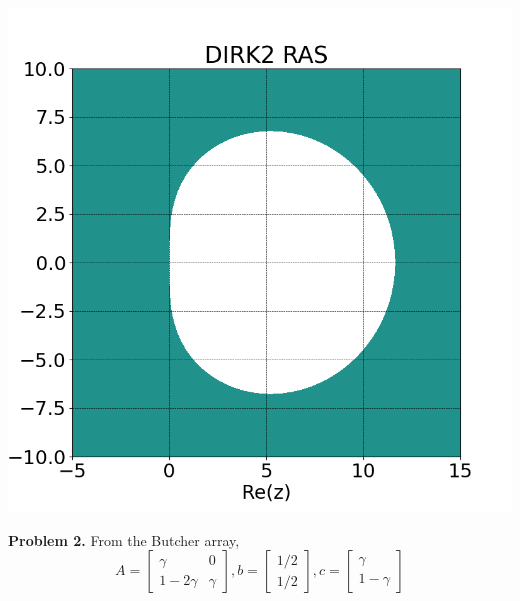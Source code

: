 \documentclass{article}
\def\tbf#1{\textbf{#1}}
\newcommand{\m}[2][b]{\begin{#1matrix}#2\end{#1matrix}}
\newcommand{\sep}[1][.5cm]{\vspace{#1}}
\begin{document}
\begin{center}
\includegraphics[scale=.3]{hw3 dirk2 RAS}
\end{center}
\sep



\tbf{Problem 2.} From the Butcher array,
$$A = \m{\gamma & 0 \\ 1-2\gamma & \gamma},
b = \m{1/2 \\ 1/2},
c = \m{\gamma \\ 1-\gamma}$$
\end{document}

